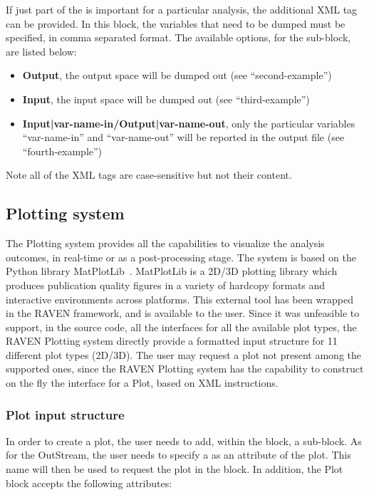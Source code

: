 If just part of the  is important for a particular analysis, the
additional XML tag  can be provided.
%
In this block, the variables that need to be dumped must be specified, in
comma separated format.
%
The available options, for the  sub-block, are listed below:
\vspace{-5mm}
\begin{itemize}
  \itemsep0em
  \item \textbf{Output}, the output space will be dumped out (see
  ``second-example'')
  \item \textbf{Input}, the input space will be dumped out (see
  ``third-example'')
  \item \textbf{Input|var-name-in/Output|var-name-out}, only the particular
  variables ``var-name-in'' and ``var-name-out'' will be reported in the output
  file (see ``fourth-example'')
\end{itemize}
\vspace{-5mm}
Note all of the XML tags are case-sensitive but not their content.
%
%
\subsection{Plotting system \label{sec:plotting}}
The Plotting system provides all the capabilities to visualize the analysis
outcomes, in real-time or as a post-processing stage.
%
The system is based on the Python library MatPlotLib~\cite{MatPlotLib}.
%
MatPlotLib is a 2D/3D plotting library which produces publication quality
figures in a variety of hardcopy formats and interactive environments across
platforms.
%
This external tool has been wrapped in the RAVEN framework, and is available to
the user.
%
Since it was unfeasible to support, in the source code, all the interfaces for
all the available plot types, the RAVEN Plotting system directly provide a
formatted input structure for 11 different plot types (2D/3D).
%
The user may request a plot not present among the supported ones, since the
RAVEN Plotting system has the capability to construct on the fly the interface
for a Plot, based on XML instructions.
%
%
\subsubsection{Plot input structure \label{sec:PlotInputStructure}}
In order to create a plot, the user needs to add, within the
 block, a  sub-block.
%
As for the  OutStream, the user needs to specify a 
 as an attribute of the plot.
%
This name will then be used to request the plot in the  block.
%
In addition, the Plot block accepts the following attributes:

